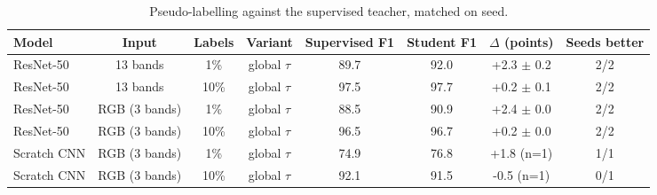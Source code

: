 \begin{table}[t]
\centering
\caption{Pseudo-labelling against the supervised teacher, matched on seed.}
\label{tab:semi_supervised}
\footnotesize
\begin{tabular}{lccccccc}
\toprule
Model & Input & Labels & Variant & Supervised F1 & Student F1 & $\Delta$ (points) & Seeds better \\
\midrule
ResNet-50 & 13 bands & 1\% & global $\tau$ & 89.7 & 92.0 & +2.3 $\pm$ 0.2 & 2/2 \\
ResNet-50 & 13 bands & 10\% & global $\tau$ & 97.5 & 97.7 & +0.2 $\pm$ 0.1 & 2/2 \\
ResNet-50 & RGB (3 bands) & 1\% & global $\tau$ & 88.5 & 90.9 & +2.4 $\pm$ 0.0 & 2/2 \\
ResNet-50 & RGB (3 bands) & 10\% & global $\tau$ & 96.5 & 96.7 & +0.2 $\pm$ 0.0 & 2/2 \\
Scratch CNN & RGB (3 bands) & 1\% & global $\tau$ & 74.9 & 76.8 & +1.8 (n=1) & 1/1 \\
Scratch CNN & RGB (3 bands) & 10\% & global $\tau$ & 92.1 & 91.5 & -0.5 (n=1) & 0/1 \\
\bottomrule
\end{tabular}
\end{table}
